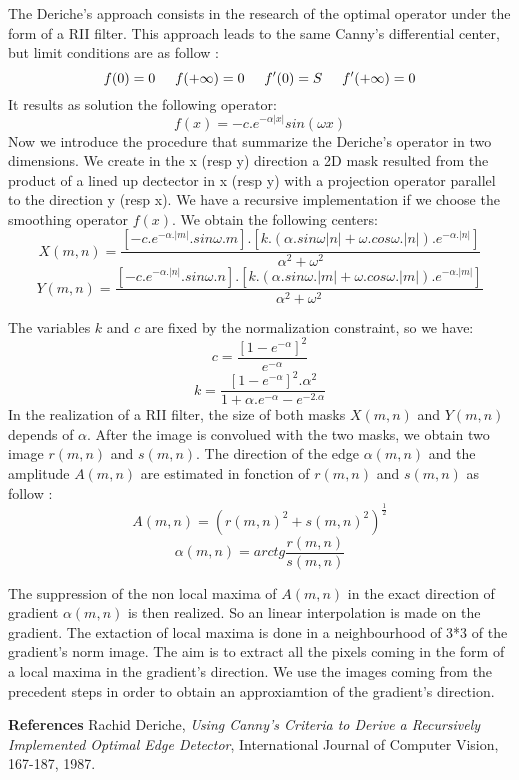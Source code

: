 The Deriche's approach consists in the research of the optimal operator under the form of a RII filter. This approach leads to the same Canny's differential center, but limit conditions are as follow :
\[
f(0)=0 \hspace{0.5cm}  f(+\infty)=0 \hspace{0.5cm}  f'(0)=S \hspace{0.5cm}  f'(+\infty)=0 
\]
It results as solution the following operator:
\[
f(x) = -c.e^{-\alpha |x|}sin(\omega x) 
\]
Now we introduce the procedure that summarize the Deriche's operator in two dimensions. We create in the x (resp y) direction a 2D mask resulted from the product of a lined up dectector in x (resp y) with a projection operator parallel to the direction y (resp x). We have a recursive implementation if we choose the smoothing operator $f(x)$.
We obtain the following centers:
\[
X(m,n)=\frac {[-c.e^{-\alpha .|m|}.sin\omega .m].[k.(\alpha .sin\omega |n|+\omega .cos \omega .|n|).e^{-\alpha .|n|}]}{\alpha ^{2}+\omega ^{2}} 
\]
\[
Y(m,n)=\frac {[-c.e^{-\alpha .|n|}.sin \omega .n].[k.(\alpha .sin\omega .|m|+\omega .cos\omega .|m|).e^{-\alpha .|m|}]}{\alpha ^{2}+\omega ^{2}} 
\]

The variables $k$ and $c$ are fixed by the normalization constraint, so we have:
\[
c=\frac {[1-e^{-\alpha }]^{2}}{e^{-\alpha } } 
\]
\[
k=\frac{[1-e^{-\alpha }]^{2}.\alpha ^{2}}{1+\alpha .e^{-\alpha}-e^{-2.\alpha}}
\]
In the realization of a RII filter, the size of both masks $X(m,n)$ and $Y(m,n)$ depends of $\alpha$. After the image is convolued with the two masks, we obtain two image  $r(m,n)$ and $s(m,n)$. The direction of the edge $\alpha (m,n)$ and the amplitude $A(m,n)$ are estimated in fonction of $r(m,n)$ and $s(m,n)$ as follow :
\[
A(m,n)=(r(m,n)^{2}+s(m,n)^{2})^{\frac{1}{2}}
\]
\[
\alpha (m,n)=arctg\frac {r(m,n)}{s(m,n)} 
\]

The suppression of the non local maxima of $A(m,n)$ in the exact direction of gradient $\alpha (m,n)$ is then realized. So an linear interpolation is made on the gradient. 
The extaction of local maxima is done in a neighbourhood of 3*3 of the gradient's norm image. The aim is to extract all the pixels coming in the form of a local maxima in the gradient's direction. We use the images coming from the precedent steps in order to obtain an approxiamtion of the gradient's direction.

\medskip

{\Large \bf References }  
Rachid Deriche, {\em Using Canny's Criteria to Derive a Recursively Implemented Optimal Edge Detector}, International Journal of Computer Vision, 167-187, 1987.
